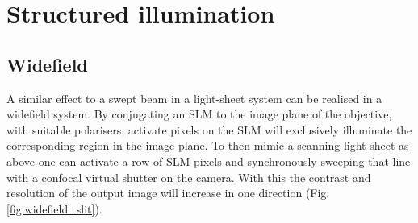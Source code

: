 %  
%  

\section{Structured illumination}


\subsection{Widefield}

A similar effect to a swept beam in a light-sheet system can be realised in a widefield system.
By conjugating an SLM to the image plane of the objective, with suitable polarisers, activate pixels on the SLM will exclusively illuminate the corresponding region in the image plane.
To then mimic a scanning light-sheet as above one can activate a row of SLM pixels and synchronously sweeping that line with a confocal virtual shutter on the camera.
With this the contrast and resolution of the output image will increase in one direction (Fig. \ref{fig:widefield_slit}).

